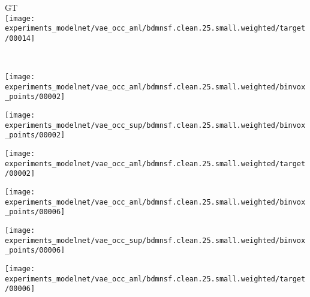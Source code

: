 \begin{minipage}[t]{0.95\textwidth}
\begin{minipage}[t]{0.155\textwidth}
        \vspace{0px}
        \centering
        \small GT\\[2mm]
        \texttt{[image: experiments\_modelnet/vae\_occ\_aml/bdmnsf.clean.25.small.weighted/target/00014]}
    \end{minipage}
    \\
    \begin{minipage}[t]{0.155\textwidth}
        \vspace{0px}
        \centering
        \texttt{[image: experiments\_modelnet/vae\_occ\_aml/bdmnsf.clean.25.small.weighted/binvox\_points/00002]}
    \end{minipage}
    \begin{minipage}[t]{0.155\textwidth}
        \vspace{0px}
        \centering
        \texttt{[image: experiments\_modelnet/vae\_occ\_sup/bdmnsf.clean.25.small.weighted/binvox\_points/00002]}
    \end{minipage}
    \begin{minipage}[t]{0.155\textwidth}
        \vspace{0px}
        \centering
        \texttt{[image: experiments\_modelnet/vae\_occ\_aml/bdmnsf.clean.25.small.weighted/target/00002]}
    \end{minipage}
    \begin{minipage}[t]{0.155\textwidth}
        \vspace{0px}
        \centering
        \texttt{[image: experiments\_modelnet/vae\_occ\_aml/bdmnsf.clean.25.small.weighted/binvox\_points/00006]}
    \end{minipage}
    \begin{minipage}[t]{0.155\textwidth}
        \vspace{0px}
        \centering
        \texttt{[image: experiments\_modelnet/vae\_occ\_sup/bdmnsf.clean.25.small.weighted/binvox\_points/00006]}
    \end{minipage}
    \begin{minipage}[t]{0.155\textwidth}
        \vspace{0px}
        \centering
        \texttt{[image: experiments\_modelnet/vae\_occ\_aml/bdmnsf.clean.25.small.weighted/target/00006]}
    \end{minipage}

\end{minipage}
